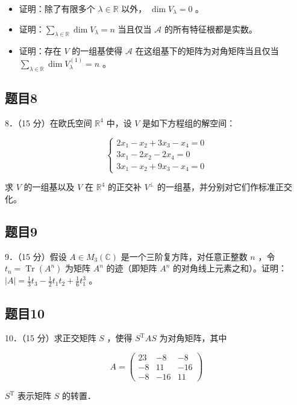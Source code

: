 \documentclass{article}
\begin{document}
\begin{itemize}
  \item[（1）] 证明：除了有限多个 \(\lambda \in \mathbb{R}\) 以外， \(\operatorname{dim} V_{\lambda}=0\) 。
  \item[（2）] 证明：\(\sum_{\lambda \in \mathbb{R}} \operatorname{dim} V_{\lambda}=n\) 当且仅当 \(\mathcal{A}\) 的所有特征根都是实数。
  \item[（3）] 证明：存在 \(V\) 的一组基使得 \(\mathcal{A}\) 在这组基下的矩阵为对角矩阵当且仅当 \(\sum_{\lambda \in \mathbb{R}} \operatorname{dim} V_{\lambda}^{(1)}=n\) 。
\end{itemize}

\subsection{题目8}
8．（15 分）在欧氏空间 \(\mathbb{R}^{4}\) 中，设 \(V\) 是如下方程组的解空间：

\[
\left\{\begin{array}{l}
2 x_{1}-x_{2}+3 x_{3}-x_{4}=0 \\
3 x_{1}-2 x_{2}-2 x_{4}=0 \\
3 x_{1}-x_{2}+9 x_{3}-x_{4}=0
\end{array}\right.
\]

求 \(V\) 的一组基以及 \(V\) 在 \(\mathbb{R}^{4}\) 的正交补 \(V^{\perp}\) 的一组基，并分别对它们作标准正交化。

\subsection{题目9}
9．（15 分）假设 \(A \in M_{3}(\mathbb{C})\) 是一个三阶复方阵，对任意正整数 \(n\) ，令 \(t_{n}=\operatorname{Tr}\left(A^{n}\right)\) 为矩阵 \(A^{n}\) 的迹（即矩阵 \(A^{n}\) 的对角线上元素之和）。证明：\(|A|=\frac{1}{3} t_{3}-\frac{1}{2} t_{1} t_{2}+\frac{1}{6} t_{1}^{3}\) 。

\subsection{题目10}
10．（15 分）求正交矩阵 \(S\) ，使得 \(S^{\mathrm{T}} A S\) 为对角矩阵，其中

\[
A=\left(\begin{array}{ccc}
23 & -8 & -8 \\
-8 & 11 & -16 \\
-8 & -16 & 11
\end{array}\right)
\]

\(S^{\mathrm{T}}\) 表示矩阵 \(S\) 的转置．
\end{document}
